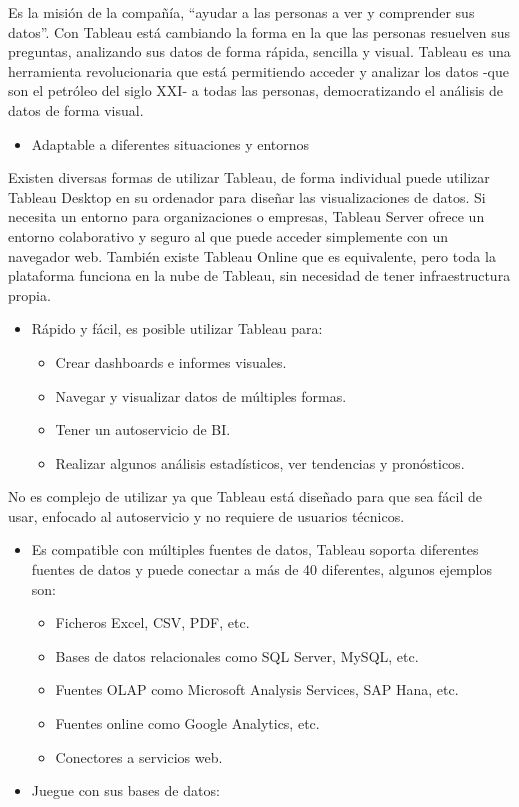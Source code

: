 \documentclass[
]{book}
\providecommand{\tightlist}{%
  \setlength{\itemsep}{0pt}\setlength{\parskip}{0pt}}
\begin{document}
Es la misión de la compañía, ``ayudar a las personas a ver y comprender sus datos''. Con Tableau está cambiando la forma en la que las personas resuelven sus preguntas, analizando sus datos de forma rápida, sencilla y visual.
Tableau es una herramienta revolucionaria que está permitiendo acceder y analizar los datos -que son el petróleo del siglo XXI- a todas las personas, democratizando el análisis de datos de forma visual.

\begin{itemize}
\tightlist
\item
  Adaptable a diferentes situaciones y entornos
\end{itemize}

Existen diversas formas de utilizar Tableau, de forma individual puede utilizar Tableau Desktop en su ordenador para diseñar las visualizaciones de datos.
Si necesita un entorno para organizaciones o empresas, Tableau Server ofrece un entorno colaborativo y seguro al que puede acceder simplemente con un navegador web. También existe Tableau Online que es equivalente, pero toda la plataforma funciona en la nube de Tableau, sin necesidad de tener infraestructura propia.

\begin{itemize}
\tightlist
\item
  Rápido y fácil, es posible utilizar Tableau para:

  \begin{itemize}
  \tightlist
  \item
    Crear dashboards e informes visuales.
  \item
    Navegar y visualizar datos de múltiples formas.
  \item
    Tener un autoservicio de BI.
  \item
    Realizar algunos análisis estadísticos, ver tendencias y pronósticos.
  \end{itemize}
\end{itemize}

No es complejo de utilizar ya que Tableau está diseñado para que sea fácil de usar, enfocado al autoservicio y no requiere de usuarios técnicos.

\begin{itemize}
\tightlist
\item
  Es compatible con múltiples fuentes de datos, Tableau soporta diferentes fuentes de datos y puede conectar a más de 40 diferentes, algunos ejemplos son:

  \begin{itemize}
  \tightlist
  \item
    Ficheros Excel, CSV, PDF, etc.
  \item
    Bases de datos relacionales como SQL Server, MySQL, etc.
  \item
    Fuentes OLAP como Microsoft Analysis Services, SAP Hana, etc.
  \item
    Fuentes online como Google Analytics, etc.
  \item
    Conectores a servicios web.
  \end{itemize}
\item
  Juegue con sus bases de datos:
\end{itemize}
\end{document}
